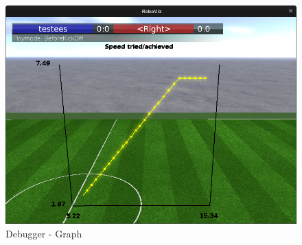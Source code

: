 \begin{figure}[H]
	\centering
	\includegraphics[width=\ScaleIfNeeded]{Grafiken/RoboViz/Graph}
	\caption{Debugger - Graph}
	\label{fig:debugger-graph}
\end{figure}
